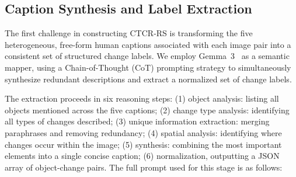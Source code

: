 \subsection{Caption Synthesis and Label Extraction}
\label{sec:chap7_extraction}
 
The first challenge in constructing CTCR-RS is transforming
the five heterogeneous, free-form human captions associated
with each image pair into a consistent set of structured
change labels. We employ Gemma~3~\cite{gemma2025} as a
semantic mapper, using a Chain-of-Thought (CoT) prompting
strategy to simultaneously synthesize redundant descriptions
and extract a normalized set of change labels.
 
The extraction proceeds in six reasoning steps: (1) object
analysis: listing all objects mentioned across the five
captions; (2) change type analysis: identifying all types
of changes described; (3) unique information extraction:
merging paraphrases and removing redundancy; (4) spatial
analysis: identifying where changes occur within the
image; (5) synthesis: combining the most important
elements into a single concise caption; (6) normalization, outputting a JSON array of object-change pairs. The full
prompt used for this stage is as follows:
 
